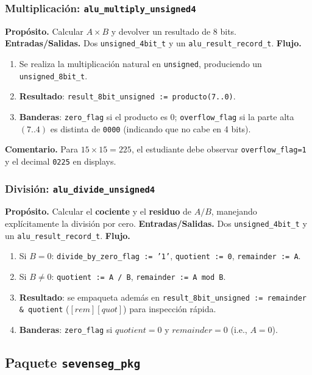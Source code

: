 \documentclass[a4paper,12pt]{article}
\begin{document}
\subsubsection{Multiplicación: \texttt{alu\_multiply\_unsigned4}}
\textbf{Propósito.} Calcular \(A \times B\) y devolver un resultado de 8 bits.  
\textbf{Entradas/Salidas.} Dos \texttt{unsigned\_4bit\_t} y un \texttt{alu\_result\_record\_t}.  
\textbf{Flujo.}
\begin{enumerate}
  \item Se realiza la multiplicación natural en \texttt{unsigned}, produciendo un \texttt{unsigned\_8bit\_t}.
  \item \textbf{Resultado}: \texttt{result\_8bit\_unsigned := producto(7..0)}.
  \item \textbf{Banderas}: \texttt{zero\_flag} si el producto es 0; \texttt{overflow\_flag} si la parte alta \((7..4)\) es distinta de \texttt{0000} (indicando que no cabe en 4 bits).
\end{enumerate}
\textbf{Comentario.} Para \(15\times15=225\), el estudiante debe observar \texttt{overflow\_flag=1} y el decimal \texttt{0225} en displays.

\subsubsection{División: \texttt{alu\_divide\_unsigned4}}
\textbf{Propósito.} Calcular el \textbf{cociente} y el \textbf{residuo} de \(A / B\), manejando explícitamente la división por cero.  
\textbf{Entradas/Salidas.} Dos \texttt{unsigned\_4bit\_t} y un \texttt{alu\_result\_record\_t}.  
\textbf{Flujo.}
\begin{enumerate}
  \item Si \(B=0\): \texttt{divide\_by\_zero\_flag := '1'}, \texttt{quotient := 0}, \texttt{remainder := A}.
  \item Si \(B\neq 0\): \texttt{quotient := A / B}, \texttt{remainder := A mod B}.
  \item \textbf{Resultado}: se empaqueta además en \texttt{result\_8bit\_unsigned := remainder \& quotient} (\([rem][quot]\)) para inspección rápida.
  \item \textbf{Banderas}: \texttt{zero\_flag} si \(quotient=0\) y \(remainder=0\) (i.e., \(A=0\)).
\end{enumerate}

\subsection{Paquete \texttt{sevenseg\_pkg}}
\label{subsec:sevenseg-pkg}
\end{document}
